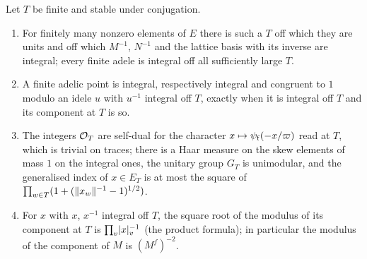 \begin{lemma}\label{lem:place-T}
Let $T$ be finite and stable under conjugation.
\begin{enumerate}[label=\textup{(\alph*)}]
\item For finitely many nonzero elements of $E$ there is such a $T$ off which they are units and off which $M^{-1}$, $N^{-1}$ and the lattice basis with its inverse are integral; every finite adele is
integral off all sufficiently large $T$.
\item A finite adelic point is integral, respectively integral and congruent to $1$ modulo an idele $u$ with $u^{-1}$ integral off $T$, exactly when it is integral off $T$ and its component at $T$ is so.
\item The integers $\mathcal{O}_T$ are self-dual for the character $x\mapsto\psi_{\rm f}(-x/\varpi)$ read at $T$, which is trivial on traces; there is a Haar measure on the skew elements of mass $1$ on the integral ones,
the unitary group $G_T$ is unimodular, and the generalised index of $x\in E_T$ is at most the square of $\prod_{w\in T}(1+(\lVert x_w\rVert^{-1}-1)^{1/2})$.
\item For $x$ with $x$, $x^{-1}$ integral off $T$, the square root of the modulus of its component at $T$ is $\prod_v\lvert x\rvert_v^{-1}$ (the product formula); in particular the modulus of the component of $M$ is $(M^f)^{-2}$.
\end{enumerate}
\end{lemma}

